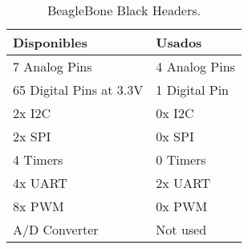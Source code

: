 	\begin{table}[h]
		\begin{tabular}{|l|l|}
			\hline
			\rowcolor[HTML]{C0C0C0} 
			{\color[HTML]{000000} \textbf{Disponibles}} & {\color[HTML]{000000} \textbf{Usados}} \\ \hline
				7 Analog Pins                               & 4 Analog Pins                          \\ \hline
				65 Digital Pins at 3.3V                     & 1 Digital Pin                          \\ \hline
				2x I2C                                      & 0x I2C                                 \\ \hline
				2x SPI                                      & 0x SPI                                 \\ \hline
				4 Timers                                    & 0 Timers                               \\ \hline
				4x UART                                     & 2x UART                                \\ \hline
				8x PWM                                      & 0x PWM                                 \\ \hline
				A/D Converter                               & Not used                               \\ \hline
		\end{tabular}
		\centering
		\caption{BeagleBone Black Headers.}
		\label{tab:BBBPins}
	\end{table}
